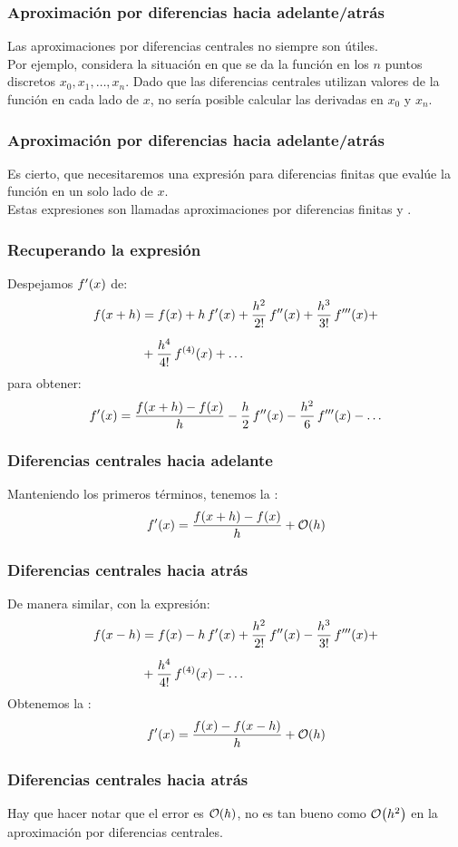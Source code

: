 \documentclass[12pt]{beamer}
\begin{document}
\begin{frame}
\frametitle{Aproximación por diferencias hacia adelante/atrás}
Las aproximaciones por diferencias centrales no siempre son útiles.
\\
\bigskip
\pause
Por ejemplo, considera la situación en que se da la función en los $n$ puntos discretos $x_{0}, x_{1}, \ldots,x_{n}$. \pause Dado que las diferencias centrales utilizan valores de la función en cada lado de $x$, no sería posible calcular las derivadas en $x_{0}$ y $x_{n}$.
\end{frame}
\begin{frame}
\frametitle{Aproximación por diferencias hacia adelante/atrás}
Es cierto, que necesitaremos una expresión para diferencias finitas que evalúe la función en un solo lado de $x$.
\\
\bigskip
\pause
Estas expresiones son llamadas aproximaciones por diferencias finitas  y .
\end{frame}
\begin{frame}
\frametitle{Recuperando la expresión}
Despejamos ${f}^{\prime} (x)$ de:
\pause
\begin{align*}
f (x + h) &= f(x) + h \, {f}^{\prime} (x) + \dfrac{h^{2}}{2!} \, {f}^{\prime \prime} (x) + \dfrac{h^{3}}{3!} \, {f}^{\prime \prime \prime} (x) + \\[0.5em]
&+ \dfrac{h^{4}}{4!} \, f^{(4)} (x) + \ldots
\end{align*}
\pause
para obtener:
\pause
\begin{align*}
{f}^{\prime} (x) = \dfrac{f (x + h) - f (x)}{h} - \dfrac{h}{2} \, {f}^{\prime \prime} (x) - \dfrac{h^{2}}{6} \, {f}^{\prime \prime \prime} (x) - \ldots
\end{align*}
\end{frame}
\begin{frame}
\frametitle{Diferencias centrales hacia adelante}
Manteniendo los primeros términos, tenemos la :
\pause
\begin{align*}
\pderivada{f} (x) = \dfrac{f (x + h) - f (x)}{h} + \order{h}
\end{align*}
\end{frame}
\begin{frame}
\frametitle{Diferencias centrales hacia atrás}
De manera similar, con la expresión:
\begin{align*}
f (x - h) &= f(x) - h \, {f}^{\prime} (x) + \dfrac{h^{2}}{2!} \, {f}^{\prime \prime} (x) - \dfrac{h^{3}}{3!} \, {f}^{\prime \prime \prime} (x) + \\[0.5em]
&+ \dfrac{h^{4}}{4!} \, f^{(4)}(x) - \ldots
\end{align*}
\pause
Obtenemos la :
\pause
\begin{align*}
\pderivada{f} (x) = \dfrac{f (x) - f(x - h)}{h} + \order{h}
\end{align*}
\end{frame}
\begin{frame}
\frametitle{Diferencias centrales hacia atrás}
Hay que hacer notar que el error es $\order{h}$, no es tan bueno como $\order{h^{2}}$ en la aproximación por diferencias centrales.
\end{frame}
\end{document}
